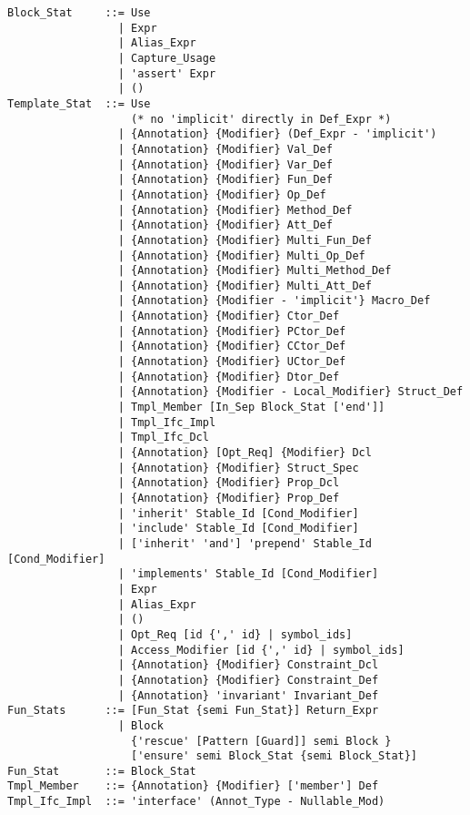 \syntax\begin{lstlisting}
Block_Stat     ::= Use
                 | Expr
                 | Alias_Expr
                 | Capture_Usage
                 | 'assert' Expr
                 | ()
Template_Stat  ::= Use
                   (* no 'implicit' directly in Def_Expr *)
                 | {Annotation} {Modifier} (Def_Expr - 'implicit')
                 | {Annotation} {Modifier} Val_Def
                 | {Annotation} {Modifier} Var_Def
                 | {Annotation} {Modifier} Fun_Def
                 | {Annotation} {Modifier} Op_Def
                 | {Annotation} {Modifier} Method_Def
                 | {Annotation} {Modifier} Att_Def
                 | {Annotation} {Modifier} Multi_Fun_Def
                 | {Annotation} {Modifier} Multi_Op_Def
                 | {Annotation} {Modifier} Multi_Method_Def
                 | {Annotation} {Modifier} Multi_Att_Def
                 | {Annotation} {Modifier - 'implicit'} Macro_Def
                 | {Annotation} {Modifier} Ctor_Def
                 | {Annotation} {Modifier} PCtor_Def
                 | {Annotation} {Modifier} CCtor_Def
                 | {Annotation} {Modifier} UCtor_Def
                 | {Annotation} {Modifier} Dtor_Def
                 | {Annotation} {Modifier - Local_Modifier} Struct_Def
                 | Tmpl_Member [In_Sep Block_Stat ['end']]
                 | Tmpl_Ifc_Impl
                 | Tmpl_Ifc_Dcl
                 | {Annotation} [Opt_Req] {Modifier} Dcl
                 | {Annotation} {Modifier} Struct_Spec
                 | {Annotation} {Modifier} Prop_Dcl
                 | {Annotation} {Modifier} Prop_Def
                 | 'inherit' Stable_Id [Cond_Modifier]
                 | 'include' Stable_Id [Cond_Modifier]
                 | ['inherit' 'and'] 'prepend' Stable_Id [Cond_Modifier]
                 | 'implements' Stable_Id [Cond_Modifier]
                 | Expr
                 | Alias_Expr
                 | ()
                 | Opt_Req [id {',' id} | symbol_ids]
                 | Access_Modifier [id {',' id} | symbol_ids]
                 | {Annotation} {Modifier} Constraint_Dcl
                 | {Annotation} {Modifier} Constraint_Def
                 | {Annotation} 'invariant' Invariant_Def
Fun_Stats      ::= [Fun_Stat {semi Fun_Stat}] Return_Expr
                 | Block
                   {'rescue' [Pattern [Guard]] semi Block }
                   ['ensure' semi Block_Stat {semi Block_Stat}]
Fun_Stat       ::= Block_Stat
Tmpl_Member    ::= {Annotation} {Modifier} ['member'] Def
Tmpl_Ifc_Impl  ::= 'interface' (Annot_Type - Nullable_Mod) 

\end{lstlisting}
